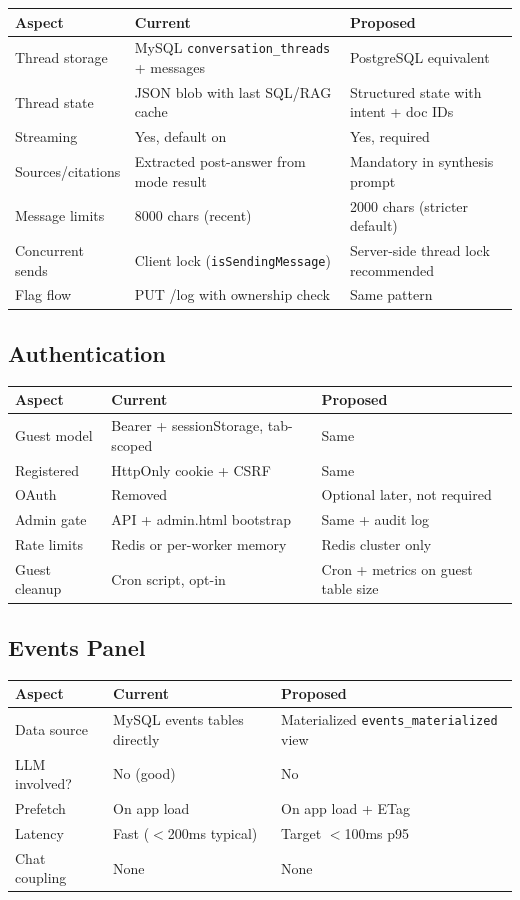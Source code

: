 \documentclass[11pt,a4paper]{article}
\begin{document}
\begin{longtable}{@{}p{3.2cm}p{5.3cm}p{5.3cm}@{}}
\toprule
\textbf{Aspect} & \textbf{Current} & \textbf{Proposed} \\
\midrule
\endhead
Thread storage & MySQL \texttt{conversation\_threads} + messages & PostgreSQL equivalent \\
Thread state & JSON blob with last SQL/RAG cache & Structured state with intent + doc IDs \\
Streaming & Yes, default on & Yes, required \\
Sources/citations & Extracted post-answer from mode result & Mandatory in synthesis prompt \\
Message limits & 8000 chars (recent) & 2000 chars (stricter default) \\
Concurrent sends & Client lock (\texttt{isSendingMessage}) & Server-side thread lock recommended \\
Flag flow & PUT /log with ownership check & Same pattern \\
\bottomrule
\end{longtable}

\subsection{Authentication}

\begin{longtable}{@{}p{3.2cm}p{5.3cm}p{5.3cm}@{}}
\toprule
\textbf{Aspect} & \textbf{Current} & \textbf{Proposed} \\
\midrule
\endhead
Guest model & Bearer + sessionStorage, tab-scoped & Same \\
Registered & HttpOnly cookie + CSRF & Same \\
OAuth & Removed & Optional later, not required \\
Admin gate & API + admin.html bootstrap & Same + audit log \\
Rate limits & Redis or per-worker memory & Redis cluster only \\
Guest cleanup & Cron script, opt-in & Cron + metrics on guest table size \\
\bottomrule
\end{longtable}

\subsection{Events Panel}

\begin{longtable}{@{}p{3.2cm}p{5.3cm}p{5.3cm}@{}}
\toprule
\textbf{Aspect} & \textbf{Current} & \textbf{Proposed} \\
\midrule
\endhead
Data source & MySQL events tables directly & Materialized \texttt{events\_materialized} view \\
LLM involved? & No (good) & No \\
Prefetch & On app load & On app load + ETag \\
Latency & Fast ($<$200ms typical) & Target $<$100ms p95 \\
Chat coupling & None & None \\
\bottomrule
\end{longtable}
\end{document}
